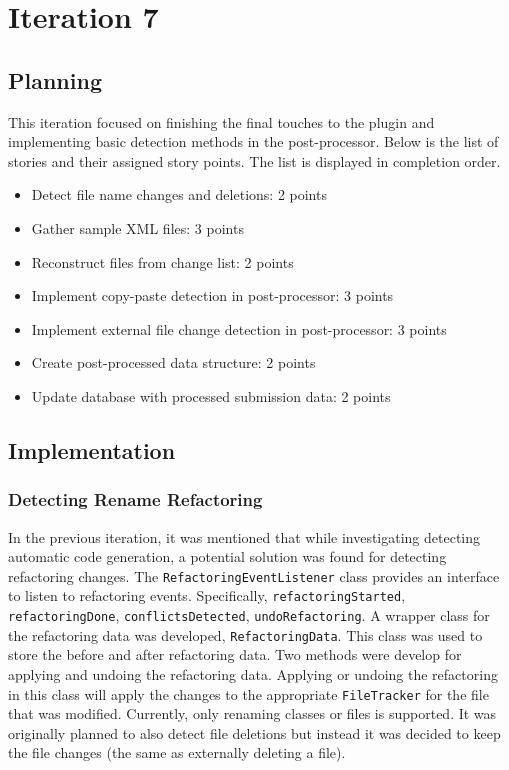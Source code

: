 \chapter{Iteration 7}
\section{Planning}
This iteration focused on finishing the final touches to the plugin and implementing basic detection methods in the post-processor. Below is the list of stories and their assigned story points. The list is displayed in completion order.

\begin{itemize}
\item Detect file name changes and deletions: 2 points
\item Gather sample XML files: 3 points
\item Reconstruct files from change list: 2 points
\item Implement copy-paste detection in post-processor: 3 points
\item Implement external file change detection in post-processor: 3 points
\item Create post-processed data structure: 2 points
\item Update database with processed submission data: 2 points
\end{itemize}

\section{Implementation}
\subsection{Detecting Rename Refactoring}
In the previous iteration, it was mentioned that while investigating detecting automatic code generation, a potential solution was found for detecting refactoring changes.  The \texttt{RefactoringEventListener} class provides an interface to listen to refactoring events. Specifically, \texttt{refactoringStarted}, \texttt{refactoringDone}, \texttt{conflictsDetected}, \texttt{undoRefactoring}. A wrapper class for the refactoring data was developed, \texttt{RefactoringData}. This class was used to store the before and after refactoring data. Two methods were develop for applying and undoing the refactoring data. Applying or undoing the refactoring in this class will apply the changes to the appropriate \texttt{FileTracker} for the file that was modified. Currently, only renaming classes or files is supported. It was originally planned to also detect file deletions but instead it was decided to keep the file changes (the same as externally deleting a file).

